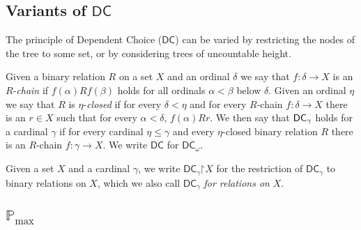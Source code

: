 \documentclass[12pt]{article}
\def\a{\alpha}
\newcommand{\pmax}{\mathbb{P}_{\mathrm{max}}}
\newcommand{\DC}{\mathsf{DC}}
\newcommand{\restrict}{\mathord{\upharpoonright}}
\begin{document}


\subsection{Variants of $\DC$}

The principle of Dependent Choice ($\DC$) can be varied by restricting the nodes of the tree to some set, or by considering trees of uncountable height.

Given a binary relation $R$ on a set $X$ and an ordinal $\delta$ we say that $f\colon\delta\rightarrow X$ is an $R$-\emph{chain} if $f(\alpha)R f(\beta)$ holds for all ordinals $\alpha < \beta$ below $\delta$. Given an ordinal $\eta$ we say that $R$ is $\eta$-\emph{closed} if for every $\delta<\eta$ and for every $R$-chain $f\colon \delta \rightarrow X$ there is an $r\in X$ such that for every $\alpha < \delta$, $f(\alpha) R r$. We then say that $\sf{DC}_{\gamma}$ holds for a cardinal $\gamma$ if for every  cardinal $\eta\leq \gamma$ and every $\eta$-closed binary relation $R$ there is an $R$-chain $f:\gamma \rightarrow X$. We write $\DC$ for $\DC_{\omega}$.

Given a set $X$ and a cardinal $\gamma$, we write $\DC_{\gamma}\restrict X$ for the restriction of $\DC_{\gamma}$ to binary relations on $X$, which we also call $\DC_{\gamma}$ \emph{for relations on} $X$.


\subsection{$\pmax$}\label{pmaxssec}
\end{document}
